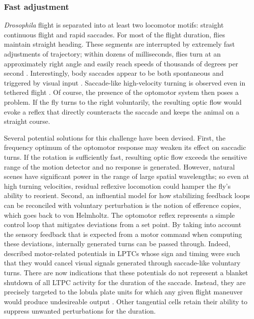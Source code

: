 \subsubsection{Fast adjustment}
\textit{Drosophila} flight is separated into at least two locomotor motifs: straight continuous flight and rapid saccades. For most of the flight duration, flies maintain straight heading. These segments are interrupted by extremely fast adjustments of trajectory; within dozens of milliseconds, flies turn at an approximately right angle and easily reach speeds of thousands of degrees per second \citep{Mronz:2008eb,Straw:2011eua,Muijres:2014aa}. Interestingly, body saccades appear to be both spontaneous and triggered by visual input \citep{Tammero:2002aa,Mronz:2008eb,Censi:2013cya}. Saccade-like high-velocity turning is observed even in tethered flight \citep{Gotz:1968aa}. Of course, the presence of the optomotor system then poses a problem. If the fly turns to the right voluntarily, the resulting optic flow would evoke a reflex that directly counteracts the saccade and keeps the animal on a straight course.


Several potential solutions for this challenge have been devised. First, the frequency optimum of the optomotor response may weaken its effect on saccadic turns. If the rotation is sufficiently fast, resulting optic flow exceeds the sensitive range of the motion detector and no response is generated. However, natural scenes have significant power in the range of large spatial wavelengths; so even at high turning velocities, residual reflexive locomotion could hamper the fly's ability to reorient. Second, an influential model for how stabilizing feedback loops can be reconciled with voluntary perturbation is the notion of efference copies, which goes back to von Helmholtz. The optomotor reflex represents a simple control loop that mitigates deviations from a set point. By taking into account the sensory feedback that is expected from a motor command when computing these deviations, internally generated turns can be passed through. Indeed, \citet{Kim:2015kr} described motor-related potentials in LPTCs whose sign and timing were such that they would cancel visual signals generated through saccade-like voluntary turns. There are now indications that these potentials do not represent a blanket shutdown of all LTPC activity for the duration of the saccade. Instead, they are precisely targeted to the lobula plate units for which any given flight maneuver would produce undesireable output \citep{Kim:2017aa}. Other tangential cells retain their ability to suppress unwanted perturbations for the duration.

